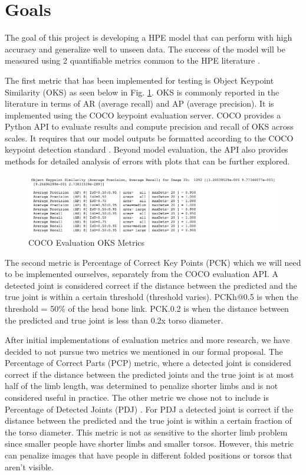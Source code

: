 \documentclass[11pt, letterpaper]{article}
\begin{document}
\section{Goals}
\label{SectionGoals}

The goal of this project is developing a HPE model that can perform with high accuracy and generalize well to unseen data. The success of the model will be measured using 2 quantifiable metrics common to the HPE literature \cite{Babu_2019}. 

The first metric that has been implemented for testing is Object Keypoint Similarity (OKS) as seen below in Fig. \ref{fig:oks_evaluation_metrics}. OKS is commonly reported in the literature in terms of AR (average recall) and AP (average precision). It is implemented using the COCO keypoint evaluation server. COCO provides a Python API \cite{coco_keypoints} to evaluate results and compute precision and recall of OKS across scales. It requires that our model outputs be formatted according to the COCO keypoint detection standard \cite{coco_format_results}. Beyond model evaluation, the API also provides methods for detailed analysis of errors with plots that can be further explored.

\begin{figure}
    \centering
    \includegraphics[width=1\textwidth]{oks_evaluation_metrics.png}
    \caption{COCO Evaluation OKS Metrics}
    \label{fig:oks_evaluation_metrics}
\end{figure}

The second metric is Percentage of Correct Key Points (PCK) \cite{Cbsudux_2019} which we will need to be implemented ourselves, separately from the COCO evaluation API. A detected joint is considered correct if the distance between the predicted and the true joint is within a certain threshold (threshold varies). PCKh@0.5 is when the threshold = 50\% of the head bone link. PCK.0.2 is when the distance between the predicted and true joint is less than 0.2x torso diameter.

After initial implementations of evaluation metrics and more research, we have decided to not pursue two metrics we mentioned in our formal proposal. The Percentage of Correct Parts (PCP) \cite{Cbsudux_2019} metric, where a detected joint is considered correct if the distance between the predicted joints and the true joint is at most half of the limb length, was determined to penalize shorter limbs and is not considered useful in practice. The other metric we chose not to include is Percentage of Detected Joints (PDJ) \cite{Cbsudux_2019}. For PDJ a detected joint is correct if the distance between the predicted and the true joint is within a certain fraction of the torso diameter. This metric is not as sensitive to the shorter limb problem since smaller people have shorter limbs and smaller torsos. However, this metric can penalize images that have people in different folded positions or torsos that aren’t visible.
\end{document}
